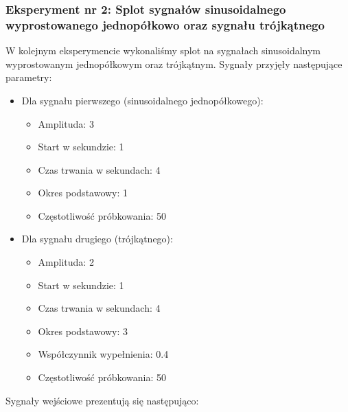 \documentclass[12pt]{article}
\begin{document}


\subsubsection{Eksperyment nr 2: Splot sygnałów sinusoidalnego wyprostowanego jednopółkowo oraz sygnału trójkątnego}

W kolejnym eksperymencie wykonaliśmy splot na sygnałach sinusoidalnym wyprostowanym jednopółkowym oraz trójkątnym. Sygnały przyjęły następujące parametry:

\begin{itemize}
    \item Dla sygnału pierwszego (sinusoidalnego jednopółkowego): 
    \begin{itemize}
        \item Amplituda: 3
        \item Start w sekundzie: 1
        \item Czas trwania w sekundach: 4
        \item Okres podstawowy: 1
        \item Częstotliwość próbkowania: 50
    \end{itemize}
    \item Dla sygnału drugiego (trójkątnego):
    \begin{itemize}
        \item Amplituda: 2
        \item Start w sekundzie: 1
        \item Czas trwania w sekundach: 4
        \item Okres podstawowy: 3
        \item Współczynnik wypełnienia: 0.4
        \item Częstotliwość próbkowania: 50
    \end{itemize}
\end{itemize}
Sygnały wejściowe prezentują się następująco:
\end{document}
